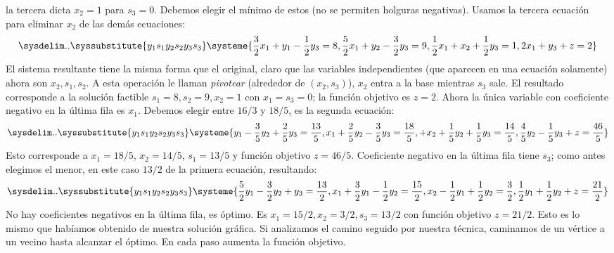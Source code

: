   la tercera dicta \(x_2 = 1\) para \(s_3 = 0\).
  Debemos elegir el mínimo de estos
  (no se permiten holguras negativas).
  Usamos la tercera ecuación para eliminar \(x_2\) de las demás ecuaciones:
  \begin{equation}
    \label{eq:lp-pivot-x2}
    \sysdelim..
    \syssubstitute{{y_1}{s_1}{y_2}{s_2}{y_3}{s_3}}
    \systeme{
         \frac{3}{2} x_1	      +	 y_1	   - \frac{1}{2} y_3	 = 8,
         \frac{5}{2} x_1		     + y_2 - \frac{3}{2} y_3	 = 9,
      \- \frac{1}{2} x_1 + x_2			   + \frac{1}{2} y_3	 = 1,
      \- 2	     x_1			   +		 y_3 + z = 2
    }
   \end{equation}
   El sistema resultante tiene la misma forma que el original,
   claro que las variables independientes
   (que aparecen en una ecuación solamente)
   ahora son \(x_2, s_1, s_2\).
   A esta operación le llaman \emph{pivotear}
   (alrededor de \((x_2, s_3)\)),
   \(x_2\) entra a la base mientras \(s_3\) sale.
   El resultado corresponde
   a la solución factible \(s_1 = 8, s_2 = 9, x_2 = 1\)
   con \(x_1 = s_3 = 0\);
   la función objetivo es \(z = 2\).
   Ahora la única variable con coeficiente negativo
   en la última fila es \(x_1\).
   Debemos elegir entre \(16/3\) y \(18/5\),
   es la segunda ecuación:
  \begin{equation}
    \label{eq:lp-pivot-x1}
    \sysdelim..
    \syssubstitute{{y_1}{s_1}{y_2}{s_2}{y_3}{s_3}}
    \systeme{
                                 y_1 - \frac{3}{5} y_2 + \frac{2}{5} y_3
           = \frac{13}{5},
                    x_1		     + \frac{2}{5} y_2 - \frac{3}{5} y_3
           = \frac{18}{5},
                        + x_2	     + \frac{1}{5} y_2 + \frac{1}{5} y_3
           = \frac{14}{5},
                                       \frac{4}{5} y_2 - \frac{1}{5} y_3
                + z
           = \frac{46}{5}
    }
   \end{equation}
   Esto corresponde a \(x_1 = 18/5\), \(x_2 = 14/5\), \(s_1 = 13/5\)
   y función objetivo \(z = 46/5\).
   Coeficiente negativo en la última fila tiene \(s_3\);
   como antes elegimos el menor,
   en este caso \(13/2\) de la primera ecuación,
   resultando:
  \begin{equation}
    \label{eq:lp-pivot-s3}
    \sysdelim..
    \syssubstitute{{y_1}{s_1}{y_2}{s_2}{y_3}{s_3}}
    \systeme{
            \frac{5}{2} y_1 - \frac{3}{2} y_2 +		   y_3
             = \frac{13}{2},
                  x_1
          + \frac{3}{2} y_1 - \frac{1}{2} y_2
             = \frac{15}{2},
                                    x_2
          - \frac{1}{2} y_1 + \frac{1}{2} y_2
             = \frac{3}{2},
           \frac{1}{2} y_1 + \frac{1}{2} y_2		       + z
             = \frac{21}{2}
    }
  \end{equation}
  No hay coeficientes negativos en la última fila,
  es óptimo.
  Es \(x_1 = 15/2, x_2 = 3/2, s_3 = 13/2\)
  con función objetivo \(z = 21/2\).
  Esto es lo mismo que habíamos obtenido de nuestra solución gráfica.
  Si analizamos el camino seguido por nuestra técnica,
  caminamos de un vértice a un vecino hasta alcanzar el óptimo.
  En cada paso aumenta la función objetivo.


